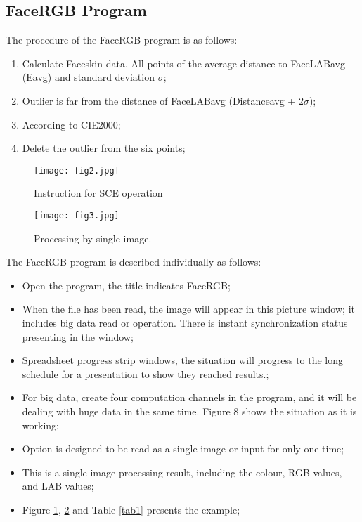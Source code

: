 \documentclass[acmsmall]{acmart}
\begin{document}
\subsection{FaceRGB Program}
The procedure of the FaceRGB program is as follows:
\begin{enumerate}
\item Calculate Faceskin data. All points of the average distance to FaceLABavg (Eavg) and standard deviation $\sigma$;
\item Outlier is far from the distance of FaceLABavg (Distanceavg +  2$\sigma$); 
\item According to CIE2000;
\item Delete the outlier from the six points;
\end{enumerate}
\begin{figure}[ht]
    \centering
    \texttt{[image: fig2.jpg]}
    \caption{Instruction for SCE operation}
    \label{fig2}
\end{figure}
\begin{figure}[ht]
    \centering
    \texttt{[image: fig3.jpg]}
    \caption{Processing by single image.}
    \label{fig3}
\end{figure}
\begin{minipage}{\textwidth}

\end{minipage}

The FaceRGB program is described individually as follows:

\begin{itemize}
\item Open the program, the title indicates FaceRGB;
\item When the file has been read, the image will appear in this picture window; it includes big data read or operation. There is instant synchronization status presenting in the window;
\item Spreadsheet progress strip windows, the situation will progress to the long schedule for a presentation to show they reached results.;
\item For big data, create four computation channels in the program, and it will be dealing with huge data in the same time. Figure 8 shows the situation as it is working;
\item Option is designed to be read as a single image or input for only one time;
\item This is a single image processing result, including the colour, RGB values, and LAB values;
\item Figure \ref{fig2}, \ref{fig3} and Table \ref{tab1} presents the example;
\end{itemize}
\end{document}
